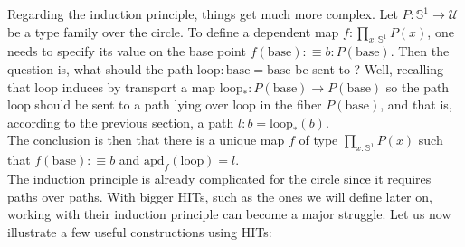 \documentclass{report}
\begin{document}
Regarding the induction principle, things get much more complex. Let $P : \mathbb{S}^1 \rightarrow \mathcal{U}$ be a type family over the circle. To define a dependent map $f : \prod_{x : \mathbb{S}^1} P(x)$, one needs to specify its value on the base point $f(\mathrm{base}) :\equiv b : P(\mathrm{base})$. Then the question is, what should the path $\mathrm{loop} : \mathrm{base} = \mathrm{base}$ be sent to ? Well, recalling that $\mathrm{loop}$ induces by transport a map $\mathrm{loop}_* : P(\mathrm{base}) \rightarrow P(\mathrm{base})$ so the path $\mathrm{loop}$ should be sent to a path lying over $\mathrm{loop}$ in the fiber $P(\mathrm{base})$, and that is, according to the previous section, a path $l : b=\mathrm{loop}_*(b)$.\\
The conclusion is then that there is a unique map $f$ of type $\prod_{x : \mathbb{S}^1} P(x)$ such that $f(\mathrm{base}):\equiv b$ and $\mathrm{apd}_f(\mathrm{loop})=l$.\\
The induction principle is already complicated for the circle since it requires paths over paths. With bigger HITs, such as the ones we will define later on, working with their induction principle can become a major struggle. Let us now illustrate a few useful constructions using HITs:
\end{document}

